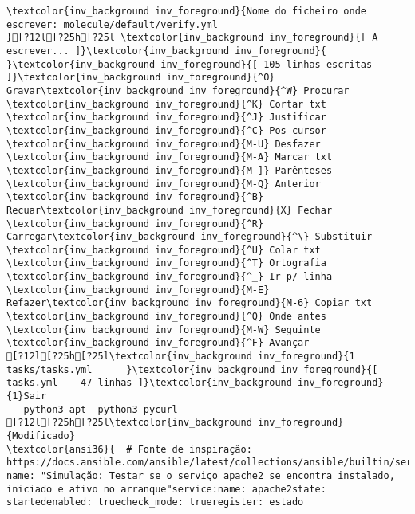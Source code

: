 \documentclass{scrartcl}
\begin{document}
\begin{Verbatim}
\textcolor{inv_background inv_foreground}{Nome do ficheiro onde escrever: molecule/default/verify.yml                                                                                                                                  }[?12l[?25h[?25l \textcolor{inv_background inv_foreground}{[ A escrever... ]}\textcolor{inv_background inv_foreground}{          }\textcolor{inv_background inv_foreground}{[ 105 linhas escritas ]}\textcolor{inv_background inv_foreground}{^O} Gravar\textcolor{inv_background inv_foreground}{^W} Procurar      \textcolor{inv_background inv_foreground}{^K} Cortar txt    \textcolor{inv_background inv_foreground}{^J} Justificar    \textcolor{inv_background inv_foreground}{^C} Pos cursor    \textcolor{inv_background inv_foreground}{M-U} Desfazer     \textcolor{inv_background inv_foreground}{M-A} Marcar txt   \textcolor{inv_background inv_foreground}{M-]} Parênteses   \textcolor{inv_background inv_foreground}{M-Q} Anterior     \textcolor{inv_background inv_foreground}{^B} Recuar\textcolor{inv_background inv_foreground}{X} Fechar  \textcolor{inv_background inv_foreground}{^R} Carregar\textcolor{inv_background inv_foreground}{^\} Substituir    \textcolor{inv_background inv_foreground}{^U} Colar txt     \textcolor{inv_background inv_foreground}{^T} Ortografia    \textcolor{inv_background inv_foreground}{^_} Ir p/ linha   \textcolor{inv_background inv_foreground}{M-E} Refazer\textcolor{inv_background inv_foreground}{M-6} Copiar txt   \textcolor{inv_background inv_foreground}{^Q} Onde antes    \textcolor{inv_background inv_foreground}{M-W} Seguinte     \textcolor{inv_background inv_foreground}{^F} Avançar
[?12l[?25h[?25l\textcolor{inv_background inv_foreground}{1      tasks/tasks.yml      }\textcolor{inv_background inv_foreground}{[ tasks.yml -- 47 linhas ]}\textcolor{inv_background inv_foreground}{1}Sair  
 - python3-apt- python3-pycurl
[?12l[?25h[?25l\textcolor{inv_background inv_foreground}{Modificado}
\textcolor{ansi36}{  # Fonte de inspiração: https://docs.ansible.com/ansible/latest/collections/ansible/builtin/service_module.html}- name: "Simulação: Testar se o serviço apache2 se encontra instalado, iniciado e ativo no arranque"service:name: apache2state: startedenabled: truecheck_mode: trueregister: estado

\end{Verbatim}
\end{document}

